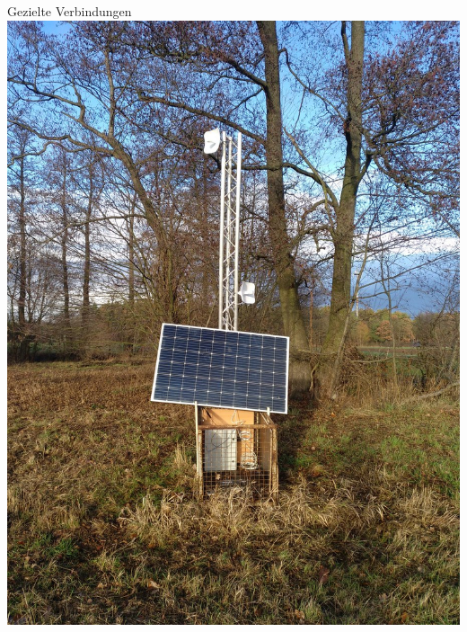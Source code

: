 \documentclass{beamer}
\begin{document}
	\begin{frame}[standout]{Gezielte Verbindungen}
		\includegraphics[height=0.9\textheight]{media/p2p-solar.jpg}
	\end{frame}
\end{document}
